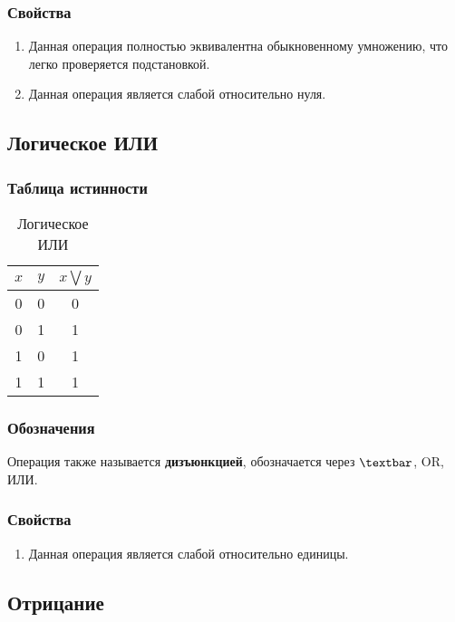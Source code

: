 \subsubsection{Свойства}
\begin{enumerate}
	\item Данная операция полностью эквивалентна обыкновенному умножению, что легко проверяется подстановкой.
	\item Данная операция является слабой относительно нуля.
\end{enumerate}

\subsection{Логическое ИЛИ}
\subsubsection{Таблица истинности}
\begin{table}[h]
	\begin{center}
		\begin{tabular}{|c|c|c|}
			\hline
			$x$ & $y$ & $x\bigvee y$\\
			\hline
			0 & 0 & 0\\
			\hline
			0 & 1 & 1\\
			\hline
			1 & 0 & 1\\
			\hline
			1 & 1 & 1\\
			\hline
		\end{tabular}
		\caption{Логическое ИЛИ}
	\end{center}
\end{table}

\subsubsection{Обозначения}
Операция также называется \textbf{дизъюнкцией}, обозначается через $\textbar$, OR, ИЛИ.

\subsubsection{Свойства}
\begin{enumerate}
	\item Данная операция является слабой относительно единицы.
\end{enumerate}

\subsection{Отрицание}
